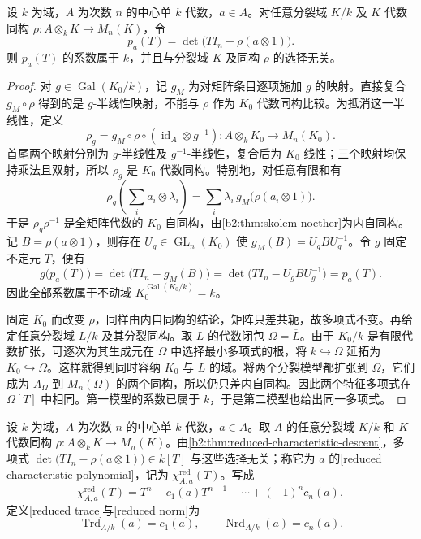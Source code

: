 \begin{theorem}\label{b2:thm:reduced-characteristic-descent}
	设 \(k\) 为域，\(A\) 为次数 \(n\) 的中心单 \(k\) 代数，\(a\in A\)。对任意分裂域 \(K/k\) 及 \(K\) 代数同构 \(\rho:A\otimes_kK\rightarrow M_n(K)\)，令
	\[
		p_a(T)=\det\bigl(TI_n-\rho(a\otimes1)\bigr).
	\]
	则 \(p_a(T)\) 的系数属于 \(k\)，并且与分裂域 \(K\) 及同构 \(\rho\) 的选择无关。
\end{theorem}
\begin{proof}
	对 \(g\in\operatorname{Gal}(K_0/k)\)，记 \(g_M\) 为对矩阵条目逐项施加 \(g\) 的映射。直接复合 \(g_M\circ\rho\) 得到的是 \(g\)-半线性映射，不能与 \(\rho\) 作为 \(K_0\) 代数同构比较。为抵消这一半线性，定义
	\[
		\rho_g=g_M\circ\rho\circ(\operatorname{id}_A\otimes g^{-1}): A\otimes_kK_0\longrightarrow M_n(K_0).
	\]
	首尾两个映射分别为 \(g\)-半线性及 \(g^{-1}\)-半线性，复合后为 \(K_0\) 线性；三个映射均保持乘法且双射，所以 \(\rho_g\) 是 \(K_0\) 代数同构。特别地，对任意有限和有
	\[
		\rho_g\left(\sum_i a_i\otimes\lambda_i\right) =\sum_i\lambda_i\,g_M\bigl(\rho(a_i\otimes1)\bigr).
	\]
	于是 \(\rho_g\rho^{-1}\) 是全矩阵代数的 \(K_0\) 自同构，由\cref{b2:thm:skolem-noether}为内自同构。记 \(B=\rho(a\otimes1)\)，则存在 \(U_g\in\operatorname{GL}_n(K_0)\) 使 \(g_M(B)=U_gBU_g^{-1}\)。令 \(g\) 固定不定元 \(T\)，便有
	\[
		g\bigl(p_a(T)\bigr) =\det\bigl(TI_n-g_M(B)\bigr) =\det\bigl(TI_n-U_gBU_g^{-1}\bigr) =p_a(T).
	\]
	因此全部系数属于不动域 \(K_0^{\operatorname{Gal}(K_0/k)}=k\)。

	固定 \(K_0\) 而改变 \(\rho\)，同样由内自同构的结论，矩阵只差共轭，故多项式不变。再给定任意分裂域 \(L/k\) 及其分裂同构。取 \(L\) 的代数闭包 \(\Omega=\overline L\)。由于 \(K_0/k\) 是有限代数扩张，可逐次为其生成元在 \(\Omega\) 中选择最小多项式的根，将 \(k\hookrightarrow\Omega\) 延拓为 \(K_0\hookrightarrow\Omega\)。这样就得到同时容纳 \(K_0\) 与 \(L\) 的域。将两个分裂模型都扩张到 \(\Omega\)，它们成为 \(A_\Omega\) 到 \(M_n(\Omega)\) 的两个同构，所以仍只差内自同构。因此两个特征多项式在 \(\Omega[T]\) 中相同。第一模型的系数已属于 \(k\)，于是第二模型也给出同一多项式。
\end{proof}

\begin{definition}\label{b2:def:reduced-trace-norm}
	设 \(k\) 为域，\(A\) 为次数 \(n\) 的中心单 \(k\) 代数，\(a\in A\)。取 \(A\) 的任意分裂域 \(K/k\) 和 \(K\) 代数同构 \(\rho:A\otimes_kK\rightarrow M_n(K)\)。由\cref{b2:thm:reduced-characteristic-descent}，多项式 \(\det\bigl(TI_n-\rho(a\otimes1)\bigr)\in k[T]\) 与这些选择无关；称它为 \(a\) 的[reduced characteristic polynomial]，记为 \(\chi^{\mathrm{red}}_{A,a}(T)\)。写成
	\[
		\chi^{\mathrm{red}}_{A,a}(T)=T^n-c_1(a)T^{n-1}+\cdots+(-1)^n c_n(a),
	\]
	定义[reduced trace]与[reduced norm]为
	\[
		\operatorname{Trd}_{A/k}(a)=c_1(a),\qquad \operatorname{Nrd}_{A/k}(a)=c_n(a).
	\]
\end{definition}

